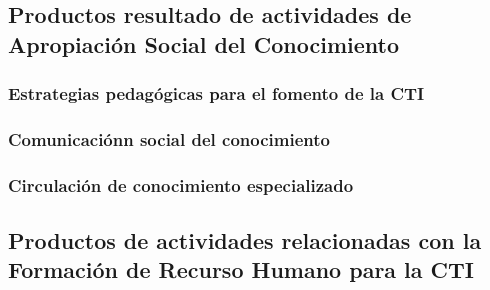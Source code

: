 \documentclass[12pt]{article}
\begin{document}
\subsection{Productos resultado de actividades de Apropiación Social
  del Conocimiento} 

\subsubsection{Estrategias pedag\'ogicas para el fomento de la CTI}

\subsubsection{Comunicaci\'onn social del conocimiento}

\subsubsection{Circulaci\'on de conocimiento especializado}


\subsection{Productos de actividades relacionadas con la Formación de Recurso
Humano para la CTI }

\end{document}
